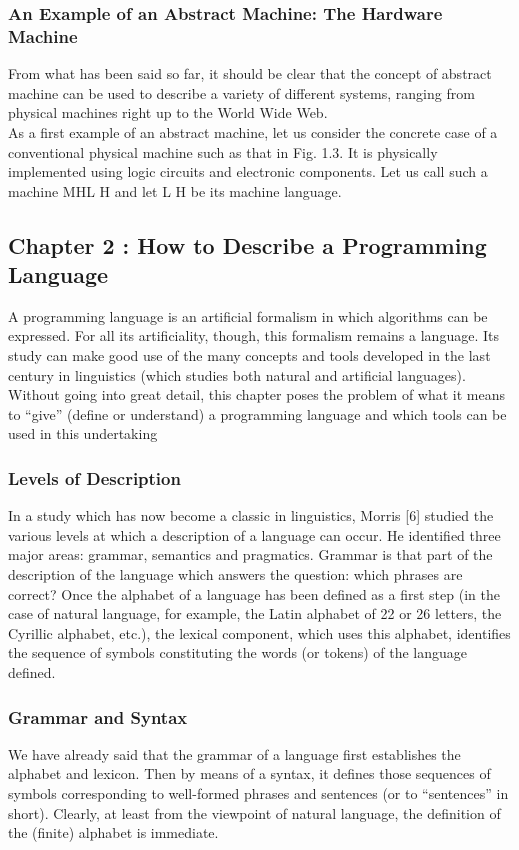 \documentclass[12pt]{article}
\begin{document}
\subsubsection{An Example of an Abstract Machine: The Hardware Machine}
From what has been said so far, it should be clear that the concept of abstract machine can be used to describe a variety of different systems, ranging from physical machines right up to the World Wide Web.\\
As a first example of an abstract machine, let us consider the concrete case of a
conventional physical machine such as that in Fig. 1.3. It is physically implemented using logic circuits and electronic components. Let us call such a machine MHL H and let L H be its machine language.
\subsection{Chapter 2 : How to Describe a Programming Language}
A programming language is an artificial formalism in which algorithms can be expressed. For all its artificiality, though, this formalism remains a language. Its study can make good use of the many concepts and tools developed in the last century in linguistics (which studies both natural and artificial languages). Without going into great detail, this chapter poses the problem of what it means to “give” (define or understand) a programming language and which tools can be used in this undertaking
\subsubsection{Levels of Description}
In a study which has now become a classic in linguistics, Morris [6] studied the
various levels at which a description of a language can occur. He identified three
major areas: grammar, semantics and pragmatics.
Grammar is that part of the description of the language which answers the question: which phrases are correct? Once the alphabet of a language has been defined as a first step (in the case of natural language, for example, the Latin alphabet of 22 or 26 letters, the Cyrillic alphabet, etc.), the lexical component, which uses this alphabet, identifies the sequence of symbols constituting the words (or tokens) of the language defined. 
\subsubsection{Grammar and Syntax}
We have already said that the grammar of a language first establishes the alphabet
and lexicon. Then by means of a syntax, it defines those sequences of symbols corresponding to well-formed phrases and sentences (or to “sentences” in short). Clearly, at least from the viewpoint of natural language, the definition of the (finite) alphabet is immediate.
\newpage
{}
\end{document}
